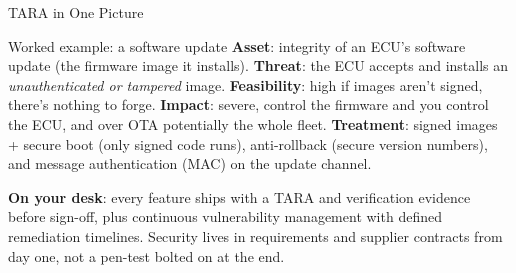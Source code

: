 \begin{frame}{TARA in One Picture}
  \centering

  \vspace{4mm}
  \begin{block}{Worked example: a software update}
    \textbf{Asset}: integrity of an ECU's software update (the firmware image it installs). \textbf{Threat}: the ECU accepts and installs an \emph{unauthenticated or tampered} image. \textbf{Feasibility}: high if images aren't signed, there's nothing to forge. \textbf{Impact}: severe, control the firmware and you control the ECU, and over OTA potentially the whole fleet. \textbf{Treatment}: signed images + secure boot (only signed code runs), anti-rollback (secure version numbers), and message authentication (MAC) on the update channel.
  \end{block}
  \vspace{1mm}
  {\footnotesize \textbf{On your desk}: every feature ships with a TARA and verification evidence before sign-off, plus continuous vulnerability management with defined remediation timelines. Security lives in requirements and supplier contracts from day one, not a pen-test bolted on at the end.}
\end{frame}
